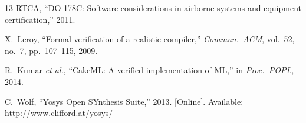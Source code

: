 \documentclass[conference]{IEEEtran}
\begin{document}
\begin{thebibliography}{13}
RTCA, ``DO-178C: Software considerations in airborne systems and
equipment certification,'' 2011.

X.~Leroy, ``Formal verification of a realistic compiler,'' \emph{Commun.\
ACM}, vol.~52, no.~7, pp.~107--115, 2009.

R.~Kumar \emph{et al.}, ``CakeML: A verified implementation of ML,'' in
\emph{Proc.\ POPL}, 2014.

C.~Wolf, ``Yosys Open SYnthesis Suite,'' 2013.
[Online]. Available: \url{http://www.clifford.at/yosys/}

\end{thebibliography}
\end{document}
